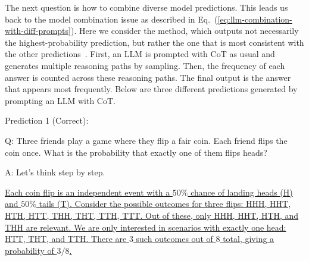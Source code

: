 The next question is how to combine diverse model predictions. This leads us back to the model combination issue as described in Eq.~(\ref{eq:llm-combination-with-diff-prompts}). Here we consider the  method, which outputs not necessarily the highest-probability prediction, but rather the one that is most consistent with the other predictions~\cite{wang-etal:2022rationale,wang-etal:2023self}. First, an LLM is prompted with CoT as usual and generates multiple reasoning paths by sampling. Then, the frequency of each answer is counted across these reasoning paths. The final output is the answer that appears most frequently. Below are three different predictions generated by prompting an LLM with CoT.

\vspace{0.5em}
Prediction 1 (Correct):
\begin{tcolorbox}

\begingroup
\setlength{\leftskip}{2em}
\setlength{\rightskip}{2em}

Q: Three friends play a game where they flip a fair coin. Each friend flips the coin once. What is the probability that exactly one of them flips heads?

\vspace{0.5em}

A: Let's think step by step.

\vspace{0.2em}

\uline{Each coin flip is an independent event with a $50\%$ chance of landing heads (H) and $50\%$ tails (T). Consider the possible outcomes for three flips: HHH, HHT, HTH, HTT, THH, THT, TTH, TTT. Out of these, only HHH, HHT, HTH, and THH are relevant. We are only interested in scenarios with exactly one head: HTT, THT, and TTH. There are $3$ such outcomes out of $8$ total, giving a probability of $3/8$.}

\endgroup

\end{tcolorbox}
\vspace{0.5em}

